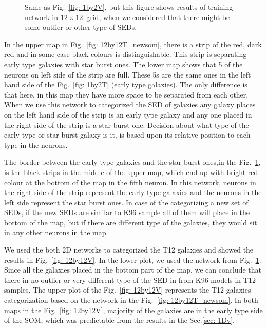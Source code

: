 \begin{figure}
\begin{subfigure}[b]{0.5\textwidth}
        \end{subfigure}
        \caption{Same as Fig.~\ref{fig: 1by2V}, but this figure shows results of training network in $12\times12$~grid, when we considered that there might be some outlier or other type of SEDs.}
        \label{fig: 12by12T_selforg}
    \end{figure}
    
    In the upper map in Fig.~\ref{fig: 12by12T_newsom}, there is a strip of the red, dark red and in some case black colours is distinguishable. 
    This strip is separating early type galaxies with star burst ones.
    The lower map shows that 5 of the neurons on left side of the strip are full. 
    These 5s are the same ones in the left hand side of the Fig.~\ref{fig: 1by2T} (early type galaxies).
    The only difference is that here, in this map they have more space to be separated from each other.
    When we use this network to categorized the SED of galaxies any galaxy places on the left hand side of the strip is an early type galaxy and any one placed in the right side of the strip is a star burst one.
    Decision about what type of the early type or star burst galaxy is it, is based upon its relative position to each type in the neurons.
    
    The border between the early type galaxies and the star burst ones,in the Fig.~\ref{fig: 12by12T_selforg}, is the black strips in the middle of the upper map, which end up with bright red colour at the bottom of the map in the fifth neuron.
    In this network, neurons in the right side of the strip represent the early type galaxies and the neurons in the left side represent the star burst ones.
    In case of the categorizing a new set of SEDs, if the new SEDs are similar to K96 sample all of them will place in the bottom of the map, but if there are different type of the galaxies, they would sit in any other neurons in the map.
    
    We used the both 2D networks to categorized the T12 galaxies and showed the results in Fig.~\ref{fig: 12by12V}.
    In the lower plot, we used the network from Fig.~\ref{fig: 12by12T_selforg}.
    Since all the galaxies placed in the bottom part of the map, we can conclude that there in no outlier or very different type of the SED in from K96 models in T12 samples.
    The upper plot of the Fig.~\ref{fig: 12by12V} represents the T12 galaxies categorization based on the network in the Fig.~\ref{fig: 12by12T_newsom}. 
    In both maps in the Fig.~\ref{fig: 12by12V}, majority of the galaxies are in the early type side of the SOM, which was predictable from the results in the Sec.\ref{sec: 1Dv}.
    
